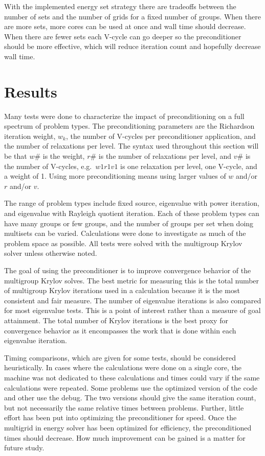 With the implemented energy set strategy there are tradeoffs between the number of sets and the number of grids for a fixed number of groups. When there are more sets, more cores can be used at once and wall time should decrease. When there are fewer sets each V-cycle can go deeper so the preconditioner should be more effective, which will reduce iteration count and hopefully decrease wall time. 

\section{Results}
Many tests were done to characterize the impact of preconditioning on a full spectrum of problem types. The preconditioning parameters are the Richardson iteration weight, $w_{k}$, the number of V-cycles per preconditioner application, and the number of relaxations per level. The syntax used throughout this section will be that $w\#$ is the weight, $r\#$ is the number of relaxations per level, and $v\#$ is the number of V-cycles, e.g.\ $w1r1v1$ is one relaxation per level, one V-cycle, and a weight of 1. Using more preconditioning means using larger values of $w$ and/or $r$ and/or $v$.  

The range of problem types include fixed source, eigenvalue with power iteration, and eigenvalue with Rayleigh quotient iteration. Each of these problem types can have many groups or few groups, and the number of groups per set when doing multisets can be varied. Calculations were done to investigate as much of the problem space as possible. All tests were solved with the multigroup Krylov solver unless otherwise noted. 

The goal of using the preconditioner is to improve convergence behavior of the multigroup Krylov solves. The best metric for measuring this is the total number of multigroup Krylov iterations used in a calculation because it is the most consistent and fair measure. The number of eigenvalue iterations is also compared for most eigenvalue tests. This is a point of interest rather than a measure of goal attainment. The total number of Krylov iterations is the best proxy for convergence behavior as it encompasses the work that is done within each eigenvalue iteration.  

Timing comparisons, which are given for some tests, should be considered heuristically. In cases where the calculations were done on a single core, the machine was not dedicated to these calculations and times could vary if the same calculations were repeated. Some problems use the optimized version of the code and other use the debug. The two versions should give the same iteration count, but not necessarily the same relative times between problems. Further, little effort has been put into optimizing the preconditioner for speed. Once the multigrid in energy solver has been optimized for efficiency, the preconditioned times should decrease. How much improvement can be gained is a matter for future study. 

